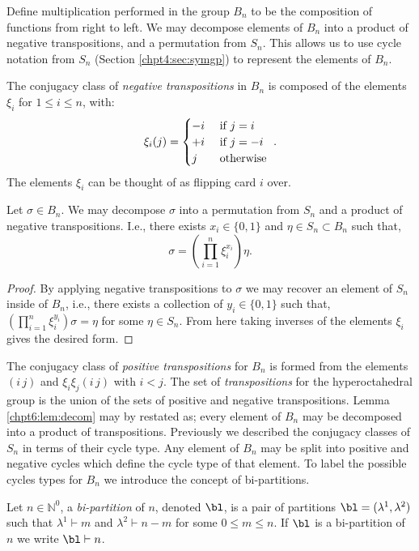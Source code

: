 \documentclass[11pt]{report}
\begin{document}
Define multiplication performed in the group $B_{n}$ to be the composition of functions from right to left. We may decompose elements of $B_{n}$ into a product of negative transpositions, and a permutation from $S_{n}$. This allows us to use cycle notation from $S_{n}$  (Section \ref{chpt4:sec:symgp}) to represent the elements of $B_{n}$.
\begin{defn}
	The conjugacy class of \emph{negative transpositions} in $B_{n}$ is composed of the elements $\xi_{i}$ for $1 \leq i \leq n$, with:
	\[\xi_{i}(j) = \begin{cases}
	-i & \textnormal{ if } j= i\\
	+i & \textnormal{ if } j=-i\\
	j & \textnormal{ otherwise }
	\end{cases}
	.\]
	The elements $\xi_{i}$ can be thought of as flipping card $i$ over.
\end{defn}
\begin{lemma}
	\label{chpt6:lem:decom}
	Let $\sigma \in B_{n}$. We may decompose $\sigma$ into a permutation from $S_{n}$ and a product of negative transpositions. I.e., there exists $x_{i} \in \{0,1\}$ and $\eta \in S_{n} \subset B_{n}$ such that,
	\[\sigma= \left(\prod_{i=1}^{n} \xi_{i}^{x_{i}}\right) \eta .\]
\end{lemma}
\begin{proof}
	By applying negative transpositions to $\sigma$ we may recover an element of $S_{n}$ inside of $B_{n}$, i.e., there exists a collection of $y_{i} \in \{0,1\}$ such that, $\left(\prod_{i=1}^{n}\xi_{i}^{y_{i}}\right) \sigma = \eta$ for some $\eta \in S_{n}$. From here taking inverses of the elements $\xi_{i}$ gives the desired form.
\end{proof}

The conjugacy class of \emph{positive transpositions} for $B_{n}$ is formed from the elements $(i \, j)$ and $\xi_{i} \xi_{j}( i \, j)$ with $i<j$. The set of \emph{transpositions} for the hyperoctahedral group is the union of the sets of positive and negative transpositions. Lemma \ref{chpt6:lem:decom} may by restated as; every element of $B_{n}$ may be decomposed into a product of transpositions.
Previously we described the conjugacy classes of $S_{n}$ in terms of their cycle type. Any element of $B_{n}$ may be split into positive and negative cycles which define the cycle type of that element. To label the possible cycles types for $B_{n}$ we introduce the concept of bi-partitions. 

\begin{defn}
	Let $n\in\mathbb{N}^{0}$, a \emph{bi-partition} of $n$, denoted $\bl$, is a pair of partitions $\bl = (\lambda^{1},\lambda^{2})$ such that $\lambda^{1} \vdash m$ and $\lambda^{2} \vdash n-m$ for some $0\leq m \leq n$. If $\bl$ is a bi-partition of $n$ we write $\bl \vdash n$.
\end{defn}
\end{document}
